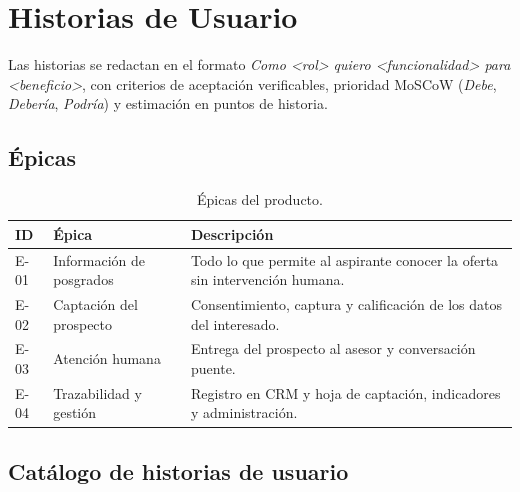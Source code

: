 \documentclass[12pt,a4paper]{report}
\newcommand{\tablacompacta}{\setstretch{1.1}\small}
\newcommand{\cabecera}[1]{\rowcolor{filacabecera}#1}
\begin{document}
\clearpage
\section{Historias de Usuario}

Las historias se redactan en el formato \textit{Como \textless rol\textgreater{} quiero
\textless funcionalidad\textgreater{} para \textless beneficio\textgreater}, con criterios de
aceptación verificables, prioridad MoSCoW (\textit{Debe}, \textit{Debería}, \textit{Podría}) y
estimación en puntos de historia.

\subsection{Épicas}

\begin{table}[H]
    \centering
    \tablacompacta
    \begin{tabularx}{\textwidth}{p{1.5cm}p{4.2cm}X}
        \toprule
        \cabecera{\textbf{ID}} & \textbf{Épica} & \textbf{Descripción} \\
        \midrule
        E-01 & Información de posgrados & Todo lo que permite al aspirante conocer la oferta sin intervención humana. \\
        E-02 & Captación del prospecto & Consentimiento, captura y calificación de los datos del interesado. \\
        E-03 & Atención humana & Entrega del prospecto al asesor y conversación puente. \\
        E-04 & Trazabilidad y gestión & Registro en CRM y hoja de captación, indicadores y administración. \\
        \bottomrule
    \end{tabularx}
    \caption{Épicas del producto.}
\end{table}

\subsection{Catálogo de historias de usuario}
\end{document}

